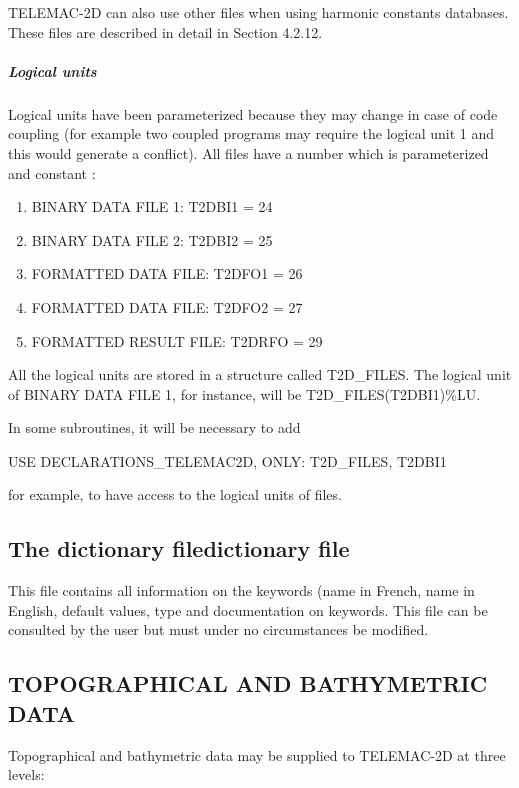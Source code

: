  TELEMAC-2D can also use other files when using harmonic constants databases. These files are described in detail in Section 4.2.12.


\subparagraph{ Logical units}

 Logical units have been parameterized because they may change in case of code coupling (for example two coupled programs may require the logical unit 1 and this would generate a conflict). All files have a number which is parameterized and constant :

\begin{enumerate}
\item  BINARY DATA FILE 1: T2DBI1 = 24

\item  BINARY DATA FILE 2: T2DBI2 = 25

\item  FORMATTED DATA FILE: T2DFO1 = 26

\item  FORMATTED DATA FILE: T2DFO2 = 27

\item  FORMATTED RESULT FILE: T2DRFO = 29
\end{enumerate}

 All the logical units are stored in a structure called T2D\_FILES. The logical unit of BINARY DATA FILE 1, for instance, will be T2D\_FILES(T2DBI1)\%LU.


 In some subroutines, it will be necessary to add

  USE DECLARATIONS\_TELEMAC2D, ONLY: T2D\_FILES, T2DBI1

 for example, to have access to the logical units of files.


\subsection{ The dictionary filedictionary file}

 This file contains all information on the keywords (name in French, name in English, default values, type and documentation on keywords. This file can be consulted by the user but must under no circumstances be modified.


\subsection{ TOPOGRAPHICAL AND BATHYMETRIC DATA}

 Topographical and bathymetric data may be supplied to TELEMAC-2D at three levels:

